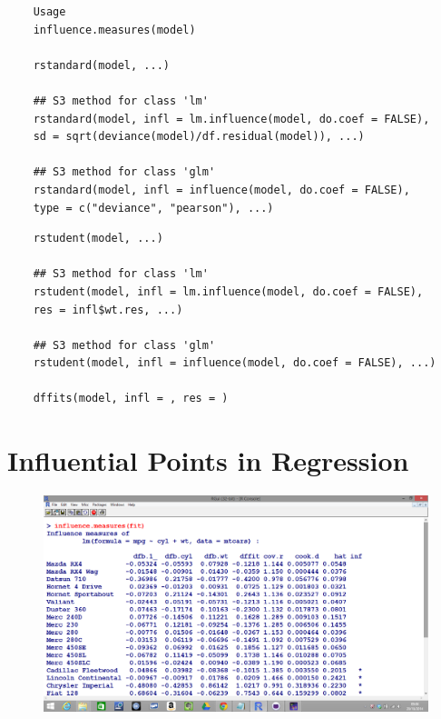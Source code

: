 \documentclass[residuals.tex]{subfiles}
\begin{document}
\begin{framed}
	\begin{verbatim}
	Usage
	influence.measures(model)
	
	rstandard(model, ...)
	
	## S3 method for class 'lm'
	rstandard(model, infl = lm.influence(model, do.coef = FALSE),
	sd = sqrt(deviance(model)/df.residual(model)), ...)
	
	## S3 method for class 'glm'
	rstandard(model, infl = influence(model, do.coef = FALSE),
	type = c("deviance", "pearson"), ...)
	\end{verbatim}
\end{framed}

\begin{framed}
	\begin{verbatim}
	rstudent(model, ...)
	
	## S3 method for class 'lm'
	rstudent(model, infl = lm.influence(model, do.coef = FALSE),
	res = infl$wt.res, ...)
	
	## S3 method for class 'glm'
	rstudent(model, infl = influence(model, do.coef = FALSE), ...)
	
	dffits(model, infl = , res = )
	\end{verbatim}
\end{framed}
\newpage
\section{Influential Points in Regression}
 



\begin{figure}
\centering
\includegraphics[width=1.1\linewidth]{Screenshot2}
\caption{}
\label{fig:Screenshot2}
\end{figure}
\end{document}
